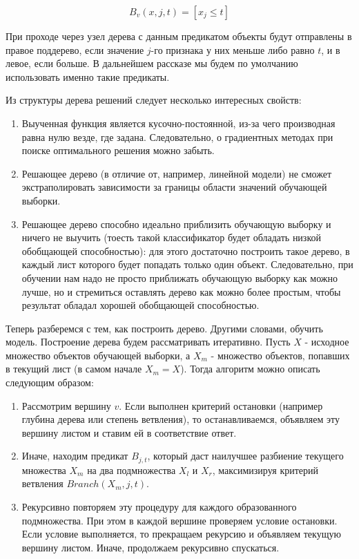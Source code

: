 \[ B_v(x,j,t)=[x_j \leq t] \]

При проходе через узел дерева с данным предикатом объекты будут отправлены в правое поддерево, если значение $j$-го признака у них меньше либо равно $t$, и в левое, если больше. В дальнейшем рассказе мы будем по умолчанию использовать именно такие предикаты.

Из структуры дерева решений следует несколько интересных свойств:\cite{SHAD-trees}

\begin{enumerate}
    \item Выученная функция является кусочно-постоянной, из-за чего производная равна нулю везде, где задана. Следовательно, о градиентных методах при поиске оптимального решения можно забыть.
    \item Решающее дерево (в отличие от, например, линейной модели) не сможет экстраполировать зависимости за границы области значений обучающей выборки.
    \item Решающее дерево способно идеально приблизить обучающую выборку и ничего не выучить (тоесть такой классификатор будет обладать низкой обобщающей способностью): для этого достаточно построить такое дерево, в каждый лист которого будет попадать только один объект. Следовательно, при обучении нам надо не просто приближать обучающую выборку как можно лучше, но и стремиться оставлять дерево как можно более простым, чтобы результат обладал хорошей обобщающей способностью.
\end{enumerate}

Теперь разберемся с тем, как построить дерево. Другими словами, обучить модель. Построение дерева будем рассматривать итеративно. Пусть $X$ - исходное множество объектов обучающей выборки, а $X_m$ - множество объектов, попавших в текущий лист (в самом начале $X_m = X$). Тогда алгоритм можно описать следующим образом:

\begin{enumerate}
    \item Рассмотрим вершину $v$. Если выполнен критерий остановки (например глубина дерева или степень ветвления), то останавливаемся, объявляем эту вершину листом и ставим ей в соответствие ответ.
    \item Иначе, находим предикат $B_{j,t}$, который даст наилучшее разбиение текущего множества $X_m$ на два подмножества $X_l$ и $X_r$, максимизируя критерий ветвления $Branch(X_m,j,t)$.
    \item Рекурсивно повторяем эту процедуру для каждого образованного подмножества. При этом в каждой вершине проверяем условие остановки. Если условие выполняется, то прекращаем рекурсию и объявляем текущую вершину листом. Иначе, продолжаем рекурсивно спускаться.
\end{enumerate}


